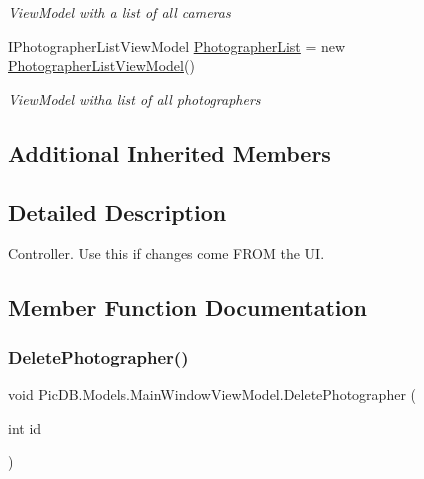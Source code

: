 \begin{DoxyCompactItemize}
\begin{DoxyCompactList}\small\item\em View\+Model with a list of all cameras \end{DoxyCompactList}\item 
I\+Photographer\+List\+View\+Model \mbox{\hyperlink{class_pic_d_b_1_1_models_1_1_main_window_view_model_a179f469a67bbddd6fd22b80e651339be}{Photographer\+List}} = new \mbox{\hyperlink{class_pic_d_b_1_1_view_models_1_1_photographer_list_view_model}{Photographer\+List\+View\+Model}}()
\begin{DoxyCompactList}\small\item\em View\+Model witha list of all photographers \end{DoxyCompactList}\end{DoxyCompactItemize}
\subsection*{Additional Inherited Members}


\subsection{Detailed Description}
Controller. Use this if changes come F\+R\+OM the UI. 



\subsection{Member Function Documentation}
\mbox{\label{class_pic_d_b_1_1_models_1_1_main_window_view_model_afe4f8464f8816c04ec3a2480f2de7339}} 
\subsubsection{\texorpdfstring{Delete\+Photographer()}{DeletePhotographer()}}
{\footnotesize\ttfamily void Pic\+D\+B.\+Models.\+Main\+Window\+View\+Model.\+Delete\+Photographer (\begin{DoxyParamCaption}\item[{int}]{id }\end{DoxyParamCaption})}



